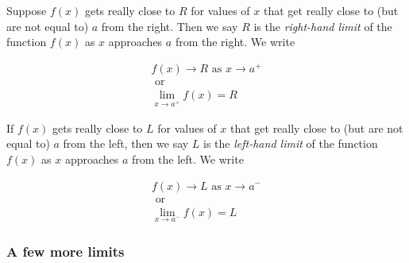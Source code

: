 \documentclass[pdftex, brazil, 12pt, twoside]{article}
\begin{document}
\begin{figure}[H]
  \begin{center}
    \label{fig:one-sided-limits-4}
  \end{center}
\end{figure}

Suppose $f(x)$ gets really close to $R$ for values of $x$ that get really
close to (but are not equal to) $a$ from the right. Then we say $R$ is the
\emph{right-hand limit} of the function $f(x)$ as $x$ approaches $a$ from the right.
We write

\begin{equation}
  \begin{split}
    f(x) \to R \text{ as } x \to a^{+}\\
    \text{ or }\\
    \lim_{x \to a^{+}} f(x) = R
  \end{split}
\end{equation}

If $f(x)$ gets really close to $L$ for values of $x$ that get really
close to (but are not equal to) $a$ from the left, then we say $L$ is the
\emph{left-hand limit} of the function $f(x)$ as $x$ approaches $a$ from the left.
We write

\begin{equation}
  \begin{split}
    f(x) \to L \text{ as } x \to a^{-}\\
    \text{ or }\\
    \lim_{x \to a^{-}} f(x) = L
  \end{split}
\end{equation}

\subsubsection{A few more limits}
\label{u0-intro-more}
\end{document}
